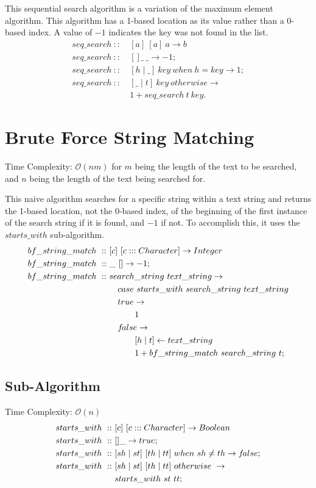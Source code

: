 \documentclass[a4paper,10pt]{book}
\newcommand\when{\  when\ }
\newcommand\otherwise{\  otherwise\ }
\newcommand{\false}{f\kern-0.25ex{alse}}
\begin{document}
This sequential search algorithm is a variation of the maximum element algorithm. This algorithm has a 1-based location as its value rather than a 0-based index. A value of $-1$ indicates the key was not found in the list.
\begin{align*}
seq\_search\ ::\ &[a]\ [a]\ a\rightarrow b\\
seq\_search\ ::\ &[]\_\ \_\rightarrow -1;\\
seq\_search\ ::\ &[h\mid \_]\ key\ when\ h=key\rightarrow 1;\\
seq\_search\ ::\ &[\_\mid t]\ key\ otherwise\rightarrow\\
	&1+seq\_search\ t\ key.
\end{align*}

\section{Brute Force String Matching}Time Complexity: $\mathcal{O}(nm)$ for $m$ being the length of the text to be searched, and $n$ being the length of the text being searched for.

This naive algorithm searches for a specific string within a text string and returns the 1-based location, not the 0-based index, of the beginning of the first instance of the search string if it is found, and $-1$ if not. To accomplish this, it uses the $starts\_with$ sub-algorithm.
\begin{align*}
bf\_string\_match\ ::\ &[c]\ [c:::Character]\rightarrow Integer\\
bf\_string\_match\ ::\ &\_\ []\rightarrow -1;\\
bf\_string\_match\ ::\ &search\_string\ text\_string\rightarrow\\
	&\quad case\ starts\_with\ search\_string\ text\_string\\
&\quad  true\rightarrow\\
&\qquad\quad 1\\
&\quad\false\rightarrow\\
&\qquad\quad [h\mid t]\leftarrow text\_string\\
&\qquad\quad 1+bf\_string\_match\ search\_string\ t;
\end{align*}
\subsection{Sub-Algorithm}Time Complexity: $\mathcal{O}(n)$
\begin{align*}
starts\_with\ ::\ &[c]\ [c:::Character]\rightarrow Boolean\\
starts\_with\ ::\ &[]\_\rightarrow true;\\
starts\_with\ ::\ &[sh\mid st]\ [th\mid tt]\when sh\ne th\rightarrow\false;\\
starts\_with\ ::\ &[sh\mid st]\ [th\mid tt]\otherwise\rightarrow\\
&starts\_with\ st\ tt;
\end{align*}
\end{document}
